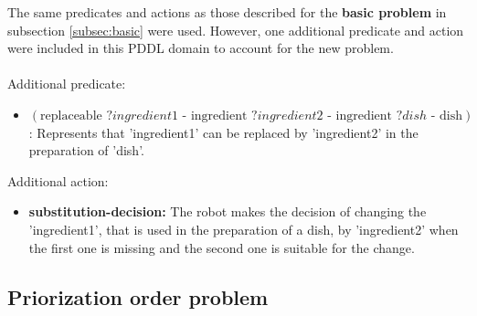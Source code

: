 The same predicates and actions as those described for the \textbf{basic problem} in subsection \ref{subsec:basic} were used. 
However, one additional predicate and action were included in this PDDL domain to account for the new problem.
\\ \\ 
Additional predicate:
\begin{itemize}
  \item $ (\text{replaceable } ?ingredient1  \text{ - ingredient }  ?ingredient2 \text{ - ingredient }  ?dish  \text{ - dish}) $: Represents that 'ingredient1' can be replaced by 'ingredient2' in the preparation of 'dish'.
\end{itemize}
Additional action:
\begin{itemize}
  \item \textbf{substitution-decision:} The robot makes the decision of changing the 'ingredient1', that is used in the preparation of 
  a dish, by 'ingredient2' when the first one is missing and the second one is suitable for the change.
\end{itemize}

\subsection{Priorization order problem}
